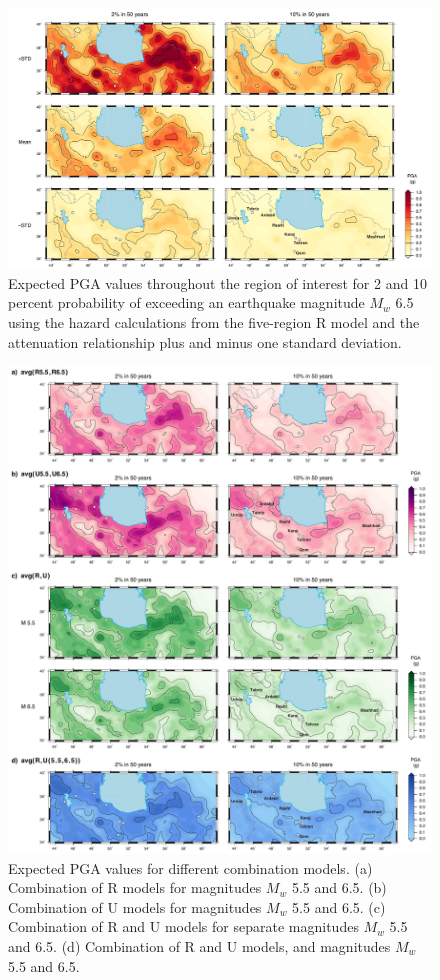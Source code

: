 \begin{figure}[t]
    \centering
    \includegraphics[width=\textwidth]{figures/pdf/figure-10.pdf} 
    \caption{Expected PGA values throughout the region of interest for 2 and 10 percent probability of exceeding an earthquake magnitude $M_w$ 6.5 using the hazard calculations from the five-region R model and the attenuation relationship plus and minus one standard deviation.}
    \label{fig:pgastd}
\end{figure}

\begin{figure}[th!]
    \centering
    \includegraphics[width=\textwidth]{figures/pdf/figure-11.pdf} 
    \caption{Expected PGA values for different combination models. (a) Combination of R models for magnitudes $M_w$ 5.5 and 6.5. (b) Combination of U models for magnitudes $M_w$ 5.5 and 6.5. (c) Combination of R and U models for separate magnitudes $M_w$ 5.5 and 6.5. (d) Combination of R and U models, and magnitudes $M_w$ 5.5 and 6.5.}
    \label{fig:pgaavgs}
\end{figure}

